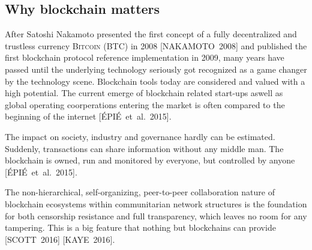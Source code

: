 \documentclass[9pt,oneside]{amsart}
\begin{document}
\begin{multicols}{2}
\subsection{Why blockchain matters}
After Satoshi Nakamoto presented the first concept of a fully decentralized and trustless currency \textsc{Bitcoin (BTC)} in 2008 [NAKAMOTO~2008] and published the first blockchain protocol reference implementation in 2009, many years have passed until the underlying technology seriously got recognized as a game changer by the technology scene. Blockchain tools today are considered and valued with a high potential. The current emerge of blockchain related start-ups aswell as global operating coorperations entering the market is often compared to the beginning of the internet [ÉPIÉ~et~al.~2015].\par
The impact on society, industry and governance hardly can be estimated. Suddenly, transactions can share information without any middle man. The blockchain is owned, run  and monitored by everyone, but controlled by anyone [ÉPIÉ~et~al.~2015].\par
The non-hierarchical, self-organizing, peer-to-peer collaboration nature of blockchain ecosystems within communitarian network structures is the foundation for both censorship resistance and full transparency, which leaves no room for any tampering. This is a big feature that nothing but blockchains can provide [SCOTT~2016] [KAYE~2016].


\end{multicols}
\end{document}
